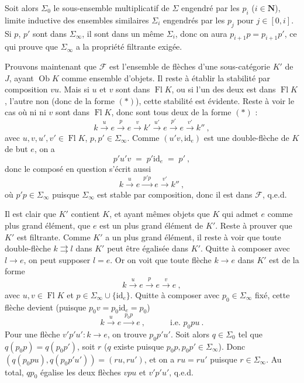 \documentclass[11pt]{article}
\newcommand{\printedpage}[1]{\marginpar{\footnotesize p.~#1}}
\newcommand{\msp}[1]{\marginpar{\footnotesize [#1]}}
\newcommand{\Ob}{\operatorname{Ob}}
\newcommand{\Fl}{\operatorname{Fl}}
\newcommand{\id}{\mathrm{id}}
\begin{document}
Soit alors $\Sigma_0$ le sous-ensemble multiplicatif de $\Sigma$ engendré par les $p_i$ ($i\in\mathbf{N}$), limite inductive des ensembles similaires $\Sigma_i$ engendrés par les $p_j$ pour $j\in[0,i]$. Si $p$, $p'$ sont dans $\Sigma_\infty$, il sont dans un même $\Sigma_i$, donc on aura $p_{i+1}p=p_{i+1}p'$, ce qui prouve que $\Sigma_\infty$ a la propriété filtrante exigée. %

Prouvons maintenant que $\mathcal{F}$ est l'ensemble de flèches d'une sous-catégorie $K'$ de $J$, ayant $\Ob K$ comme ensemble d'objets. Il reste à établir la stabilité par composition $vu$. Mais si $u$ et $v$ sont dans $\Fl K$, ou si l'un des deux est dans $\Fl K$, l'autre non (donc de la forme $(*)$), cette stabilité est évidente. Reste à voir le cas où ni ni $v$ sont dans $\Fl K$, donc sont tous deux de la forme $(*)$ :
\[
k \xrightarrow{\ u\ } e \xrightarrow{\ p\ } e \xrightarrow{\ v\ } k' \xrightarrow{\ u'\ } e \xrightarrow{\ p'\ } e \xrightarrow{\ v'\ } k''\ ,
\]
avec $u,v,u',v'\in\Fl K$, $p,p'\in\Sigma_\infty$. Comme $(u'v,\id_e)$ est une double-flèche de
\printedpage{140}
\msp{page 369}
$K$ de but $e$, on a
\[
p'u'v \;=\; p'\id_e \;=\; p'\ ,
\]
donc le composé en question s'écrit aussi
\[
k \xrightarrow{\ u\ } e \xrightarrow{\ p'p\ } e \xrightarrow{\ v'\ } k''\ ,
\]
où $p'p\in\Sigma_\infty$ puisque $\Sigma_\infty$ est stable par composition, donc il est dans $\mathcal{F}$, q.e.d.

Il est clair que $K'$ contient $K$, et ayant mêmes objets que $K$ qui admet $e$ comme plus grand élément, que $e$ est un plus grand élément de $K'$. Reste à prouver que $K'$ est filtrante. Comme $K'$ a un plus grand élément, il reste à voir que toute double-flèche $k\rightrightarrows l$ dans $K'$ peut être égalisée dans $K'$. Quitte à composer avec $l\longrightarrow e$, on peut supposer $l=e$. Or on voit que toute flèche $k\longrightarrow e$ dans $K'$ est de la forme
\[
k \xrightarrow{\ u\ } e \xrightarrow{\ p\ } e \xrightarrow{\ v\ } e\ ,
\]
avec $u,v\in\Fl K$ et $p\in\Sigma_\infty\cup\{\id_e\}$. Quitte à composer avec $p_0\in\Sigma_\infty$ fixé, cette flèche devient (puisque $p_0v=p_0\id_e=p_0$)
\[
k \xrightarrow{\ u\ } e \xrightarrow{\ p_0p\ } e\ , \qquad\quad \text{i.e. } p_0pu\ .
\]
Pour une flèche $v'p'u' : k\longrightarrow e$, on trouve $p_0p'u'$. Soit alors $q\in\Sigma_0$ tel que $q(p_0p)=q(p_0p')$, soit $r$ ($q$ existe puisque $p_0p,p_0p'\in\Sigma_\infty$). Donc $(q(p_0pu),q(p_0p'u'))=(ru,ru')$, et on a $ru=ru'$ puisque $r\in\Sigma_\infty$. Au total, $qp_0$ égalise les deux flèches $vpu$ et $v'p'u'$, q.e.d.
\end{document}
